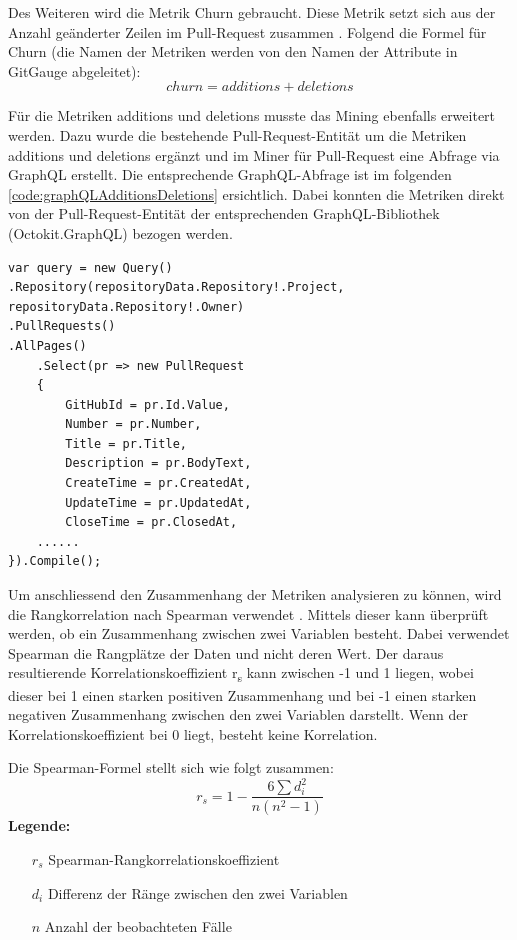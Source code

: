 Des Weiteren wird die Metrik Churn gebraucht. Diese Metrik setzt sich aus der Anzahl geänderter Zeilen im Pull-Request zusammen \parencite{gousios_exploratory_2014}. Folgend die Formel für Churn (die Namen der Metriken werden von den Namen der Attribute in GitGauge abgeleitet): 
\begin{equation}
churn = additions + deletions
\end{equation}

Für die Metriken additions und deletions musste das Mining ebenfalls erweitert werden. Dazu wurde die bestehende Pull-Request-Entität um die Metriken additions und deletions ergänzt und im Miner für Pull-Request eine Abfrage via GraphQL erstellt. Die entsprechende GraphQL-Abfrage ist im folgenden \autoref{code:graphQLAdditionsDeletions} ersichtlich. Dabei konnten die Metriken direkt von der Pull-Request-Entität der entsprechenden GraphQL-Bibliothek (Octokit.GraphQL) bezogen werden.


\begin{lstlisting}[language=CSharp, caption={GraphQL-Abfrage additions und deletions}, label={code:graphQLAdditionsDeletions}]
var query = new Query()
.Repository(repositoryData.Repository!.Project, repositoryData.Repository!.Owner)
.PullRequests()
.AllPages()
    .Select(pr => new PullRequest
    {
        GitHubId = pr.Id.Value,
        Number = pr.Number,
        Title = pr.Title,
        Description = pr.BodyText,
        CreateTime = pr.CreatedAt,
        UpdateTime = pr.UpdatedAt,
        CloseTime = pr.ClosedAt,
    ......
}).Compile();
\end{lstlisting}

Um anschliessend den Zusammenhang der Metriken analysieren zu können, wird die Rangkorrelation nach Spearman verwendet \parencite{noauthor_t-test_nodate}. Mittels dieser kann überprüft werden, ob ein Zusammenhang zwischen zwei Variablen besteht. Dabei verwendet Spearman die Rangplätze der Daten und nicht deren Wert. Der daraus resultierende Korrelationskoeffizient r\textsubscript{s} kann zwischen -1 und 1 liegen, wobei dieser bei 1 einen starken positiven Zusammenhang und bei -1 einen starken negativen Zusammenhang zwischen den zwei Variablen darstellt. Wenn der Korrelationskoeffizient bei 0 liegt, besteht keine Korrelation. \parencite{noauthor_t-test_nodate}


Die Spearman-Formel \parencite{noauthor_t-test_nodate} stellt sich wie folgt zusammen: 
\begin{equation}
r_s = 1 - \frac{6 \sum d_i^2}{n(n^2 - 1)}
\end{equation}
\label{eqn:spearman}
\noindent\textbf{Legende:}
\begin{itemize}
  \item [$r_s$] Spearman-Rangkorrelationskoeffizient
  \item[$d_i$] Differenz der Ränge zwischen den zwei Variablen 
  \item[$n$] Anzahl der beobachteten Fälle
\end{itemize}

